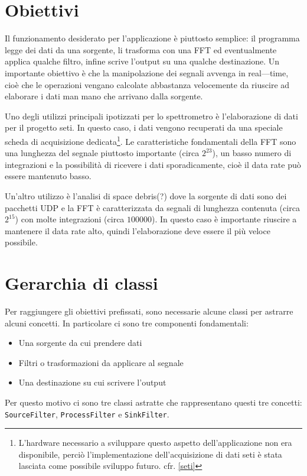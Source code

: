 \documentclass[a4paper,11pt,twoside,openright]{unibo}
\begin{document}
\section{Obiettivi}
Il funzionamento desiderato per l'applicazione \`e piuttosto semplice: il
programma legge dei dati da una sorgente, li trasforma con una \ac{FFT} ed
eventualmente applica qualche filtro, infine scrive l'output su una qualche
destinazione. Un importante obiettivo \`e che la manipolazione dei segnali
avvenga in real---time, cio\`e che le operazioni vengano calcolate abbastanza
velocemente da riuscire ad elaborare i dati man mano che arrivano dalla
sorgente.

Uno degli utilizzi principali ipotizzati per lo spettrometro \`e l'elaborazione
di dati per il progetto \ac{seti}. In questo caso, i dati vengono recuperati da
una speciale scheda di acquisizione dedicata\footnote{L'hardware necessario a
sviluppare questo aspetto dell'applicazione non era disponibile, perci\`o
    l'implementazione dell'acquisizione di dati \ac{seti} \`e stata lasciata
    come possibile sviluppo futuro. cfr. \ref{seti}}.
Le caratteristiche fondamentali della \ac{FFT} sono una lunghezza del segnale
piuttosto importante (circa $2^{23}$), un basso numero di integrazioni e la
possibilit\`a di ricevere i dati sporadicamente, cio\`e il data rate pu\`o
essere mantenuto basso.

Un'altro utilizzo \`e l'analisi di space debris(?) dove la sorgente di dati sono
dei pacchetti UDP e la \ac{FFT} \`e caratterizzata da segnali di lunghezza contenuta
(circa $2^{15}$) con molte integrazioni (circa $100000$). In questo caso \`e
importante riuscire a mantenere il data rate alto, quindi l'elaborazione deve
essere il pi\`u veloce possibile.

\section{Gerarchia di classi}
Per raggiungere gli obiettivi prefissati, sono necessarie alcune classi per
astrarre alcuni concetti. In particolare ci sono tre componenti fondamentali:
\begin{itemize}
\item Una sorgente da cui prendere dati
\item Filtri o trasformazioni da applicare al segnale
\item Una destinazione su cui scrivere l'output
\end{itemize}
Per questo motivo ci sono tre classi astratte che rappresentano questi tre
concetti: \texttt{SourceFilter}, \texttt{ProcessFilter} e \texttt{SinkFilter}.
\end{document}
